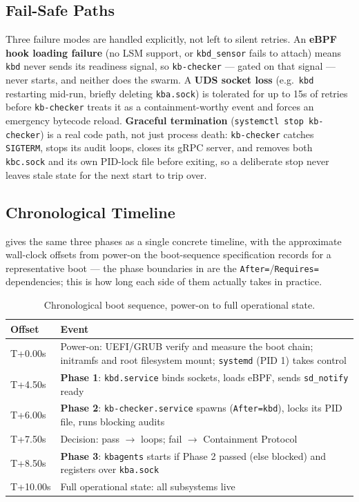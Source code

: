 \documentclass{article}
\begin{document}
\subsection{Fail-Safe Paths}

Three failure modes are handled explicitly, not left to silent
retries. An \textbf{eBPF hook loading failure} (no LSM support, or
\texttt{kbd\_sensor} fails to attach) means \texttt{kbd} never sends
its readiness signal, so \texttt{kb-checker} --- gated on that signal
--- never starts, and neither does the swarm. A \textbf{UDS socket
loss} (e.g.\ \texttt{kbd} restarting mid-run, briefly deleting
\texttt{kba.sock}) is tolerated for up to 15s of retries before
\texttt{kb-checker} treats it as a containment-worthy event and forces
an emergency bytecode reload. \textbf{Graceful termination}
(\texttt{systemctl stop kb-checker}) is a real code path, not just
process death: \texttt{kb-checker} catches \texttt{SIGTERM}, stops its
audit loops, closes its gRPC server, and removes both
\texttt{kbc.sock} and its own PID-lock file before exiting, so a
deliberate stop never leaves stale state for the next start to trip
over.

\subsection{Chronological Timeline}
\label{sec:boot-timeline}

 gives the same three phases as a single
concrete timeline, with the approximate wall-clock offsets from
power-on the boot-sequence specification records for a representative
boot --- the phase boundaries in  are the
\texttt{After=}/\texttt{Requires=} dependencies; this is how long each
side of them actually takes in practice.

\begin{table}[h]
\centering
\scriptsize
\renewcommand{\arraystretch}{0.95}
\caption{Chronological boot sequence, power-on to full operational state.}
\label{tab:boot-timeline}
\begin{tabular}{@{}p{1.1cm}p{6.2cm}@{}}
\toprule
Offset & Event \\
\midrule
T+0.00s & Power-on: UEFI/GRUB verify and measure the boot chain; initramfs and root filesystem mount; \texttt{systemd} (PID 1) takes control \\
T+4.50s & \textbf{Phase 1}: \texttt{kbd.service} binds sockets, loads eBPF, sends \texttt{sd\_notify} ready \\
T+6.00s & \textbf{Phase 2}: \texttt{kb-checker.service} spawns (\texttt{After=kbd}), locks its PID file, runs blocking audits \\
T+7.50s & Decision: pass $\to$ loops; fail $\to$ Containment Protocol \\
T+8.50s & \textbf{Phase 3}: \texttt{kbagents} starts if Phase 2 passed (else blocked) and registers over \texttt{kba.sock} \\
T+10.00s & Full operational state: all subsystems live \\
\bottomrule
\end{tabular}
\end{table}
\FloatBarrier
\end{document}
